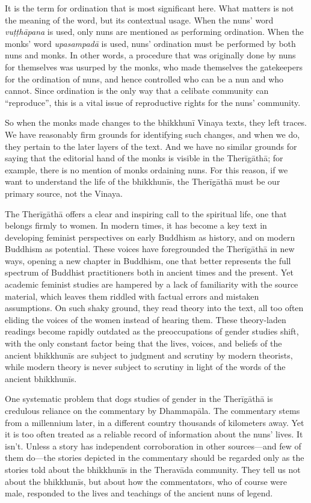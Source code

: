 \documentclass[12pt,openany]{book}%
\begin{document}
It is the term for ordination that is most significant here. What matters is not the meaning of the word, but its contextual usage. When the nuns’ word \textit{\textsanskrit{vuṭṭhāpana}} is used, only nuns are mentioned as performing ordination. When the monks’ word \textit{\textsanskrit{upasampadā}} is used, nuns’ ordination must be performed by both nuns and monks. In other words, a procedure that was originally done by nuns for themselves was usurped by the monks, who made themselves the gatekeepers for the ordination of nuns, and hence controlled who can be a nun and who cannot. Since ordination is the only way that a celibate community can “reproduce”, this is a vital issue of reproductive rights for the nuns’ community.

So when the monks made changes to the \textsanskrit{bhikkhunī} Vinaya texts, they left traces. We have reasonably firm grounds for identifying such changes, and when we do, they pertain to the later layers of the text. And we have no similar grounds for saying that the editorial hand of the monks is visible in the \textsanskrit{Therīgāthā}; for example, there is no mention of monks ordaining nuns. For this reason, if we want to understand the life of the \textsanskrit{bhikkhunīs}, the \textsanskrit{Therīgāthā} must be our primary source, not the Vinaya.

The \textsanskrit{Therīgāthā} offers a clear and inspiring call to the spiritual life, one that belongs firmly to women. In modern times, it has become a key text in developing feminist perspectives on early Buddhism as history, and on modern Buddhism as potential. These voices have foregrounded the \textsanskrit{Therīgāthā} in new ways, opening a new chapter in Buddhism, one that better represents the full spectrum of Buddhist practitioners both in ancient times and the present. Yet academic feminist studies are hampered by a lack of familiarity with the source material, which leaves them riddled with factual errors and mistaken assumptions. On such shaky ground, they read theory into the text, all too often eliding the voices of the women instead of hearing them. These theory-laden readings become rapidly outdated as the preoccupations of gender studies shift, with the only constant factor being that the lives, voices, and beliefs of the ancient \textsanskrit{bhikkhunīs} are subject to judgment and scrutiny by modern theorists, while modern theory is never subject to scrutiny in light of the words of the ancient \textsanskrit{bhikkhunīs}.

One systematic problem that dogs studies of gender in the \textsanskrit{Therīgāthā} is credulous reliance on the commentary by \textsanskrit{Dhammapāla}. The commentary stems from a millennium later, in a different country thousands of kilometers away. Yet it is too often treated as a reliable record of information about the nuns’ lives. It isn’t. Unless a story has independent corroboration in other sources—and few of them do—the stories depicted in the commentary should be regarded only as the stories told about the \textsanskrit{bhikkhunīs} in the \textsanskrit{Theravāda} community. They tell us not about the \textsanskrit{bhikkhunīs}, but about how the commentators, who of course were male, responded to the lives and teachings of the ancient nuns of legend.
\end{document}
